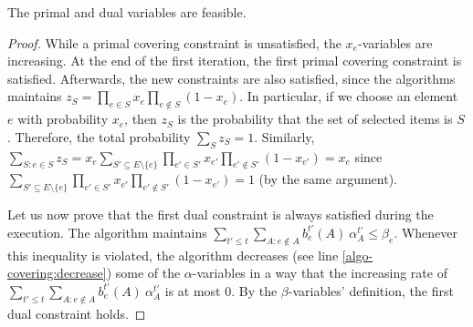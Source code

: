 \begin{lemma} \label{lem:prim-dual-feasible}
The primal and dual variables are feasible.
\end{lemma}
%
\begin{proof}
While a primal covering constraint is unsatisfied, the $x_e$-variables are increasing. At the end of the first iteration, the first primal covering constraint is satisfied. Afterwards, the new constraints are
also satisfied, since the algorithms maintains $z_{S} = \prod_{e \in S} x_{e} \prod_{e \notin S} (1 - x_{e})$.
In particular, if we choose an element $e$ with probability $x_{e}$, then $z_{S}$ is the probability
that the set of selected items is $S$. Therefore, the total probability $\sum_{S} z_{S} = 1$.
Similarly, $\sum_{S: e \in S} z_{S} = x_{e} \sum_{S' \subseteq E \setminus \{e\}} \prod_{e' \in S'} x_{e'} \prod_{e' \notin S'} (1 - x_{e'}) = x_{e}$
since $\sum_{S' \subseteq E \setminus \{e\}} \prod_{e' \in S'} x_{e'} \prod_{e' \notin S'} (1 - x_{e'}) = 1$ (by the same argument).


Let us now prove that the first dual constraint is always satisfied during the execution. The algorithm maintains $\sum_{t' \le t} \sum_{A: e \notin A} b^{t'}_{e}(A)\ \alpha^{t'}_{A} \leq \beta_{e}$. %
Whenever this inequality is violated, the algorithm decreases (see line \ref{algo-covering:decrease}) some of the $\alpha$-variables in a way that the increasing rate of $\sum_{t' \le t} \sum_{A: e \notin A} b^{t'}_{e}(A)\ \alpha^{t'}_{A}$ is at most 0. By the $\beta$-variables' definition, the first dual constraint holds.


\end{proof}
